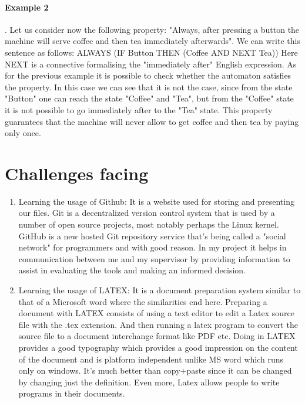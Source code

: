\documentclass{article}
\begin{document}
\paragraph{Example 2}.
Let us consider now the following property: "Always, after pressing a button the machine will serve coffee and then tea immediately afterwards". We can write this sentence as follows:
ALWAYS (IF Button THEN (Coffee AND NEXT Tea))
Here NEXT is a connective formalising the "immediately after" English expression. As for the previous example it is possible to check whether the automaton satisfies the property. In this case we can see that it is not the case, since from the state "Button" one can reach the state "Coffee" and "Tea", but from the "Coffee" state it is not possible to go immediately after to the "Tea" state. This property guarantees that the machine will never allow to get coffee and then tea by paying only once.


\section{Challenges facing}
\label{sec:challenges}


\begin{enumerate}
\item Learning the usage of Github: It is a website used for storing and presenting our files. Git is a decentralized version control system that is used by a number of open source projects, most notably perhaps the Linux kernel. GitHub is a new hosted Git repository service that's being called a "social network" for programmers and with good reason. In my project it helps in communication between me and my supervisor by providing information to assist in evaluating the tools and making an informed decision.
\item Learning the usage of LATEX: It is a document preparation system similar to that of a Microsoft word where the similarities end here. Preparing a document with LATEX consists of using a text editor to edit a Latex source file with the .tex extension. And then running a latex program to convert the source file to a document interchange format like PDF etc. Doing in LATEX provides a good typography which provides a good impression on the content of the document and is platform independent unlike MS word which runs only on windows. It's much better than copy+paste since it can be changed by changing just the definition. Even more, Latex allows people to write programs in their documents. 
\end{enumerate}
\end{document}
